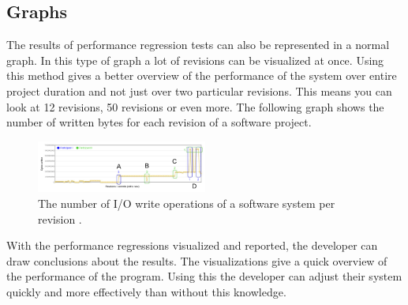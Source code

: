 \subsection{Graphs}
The results of performance regression tests can also be represented in a normal graph. In this type of graph a lot of revisions can be visualized at once. Using this method gives a better overview of the performance of the system over entire project duration and not just over two particular revisions. This means you can look at 12 revisions, 50 revisions or even more. The following graph shows the number of written bytes for each revision of a software project.

\begin{figure}[h]
\begin{center}
  \includegraphics[width=0.5\textwidth]{Figures/bytegraph.png}
\end{center}
  \caption{The number of I/O write operations of a software system per revision \cite{bezemer2014detecting}.}

\end{figure}
With the performance regressions visualized and reported, the developer can draw conclusions about the results. The visualizations give a quick overview of the performance of the program. Using this the developer can adjust their system quickly and more effectively than without this knowledge.









